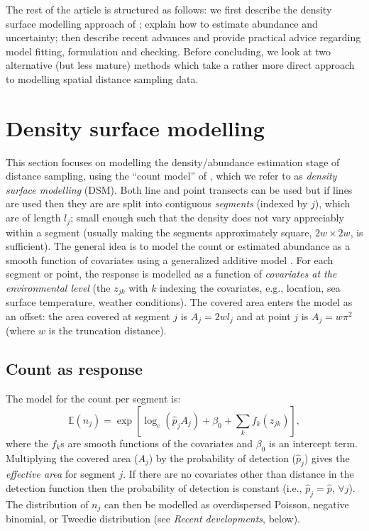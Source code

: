 \documentclass[a4paper,12pt]{article}
\begin{document}
The rest of the article is structured as follows: we first describe the density surface modelling approach of \cite{Hedley:2004et}; explain how to estimate abundance and uncertainty; then describe recent advances and provide practical advice regarding model fitting, formulation and checking. Before concluding, we look at two alternative (but less mature) methods which take a rather more direct approach to modelling spatial distance sampling data.


\section*{Density surface modelling}
\label{s:dsm}

This section focuses on modelling the density/abundance estimation stage of distance sampling, using the ``count model'' of \cite{Hedley:2004et}, which we refer to as \textit{density surface modelling} (DSM). Both line and point transects can be used but if lines are used then they are are split into contiguous \textit{segments} (indexed by $j$), which are of length $l_j$; small enough such that the density does not vary appreciably within a segment (usually making the segments approximately square, $2w\times 2w$, is sufficient). The general idea is to model the count or estimated abundance as a smooth function of covariates using a generalized additive model \cite[GAM; e.g.][]{Wood:2006wz}. For each segment or point, the response is modelled as a function of \textit{covariates at the environmental level} (the $z_{jk}$ with $k$ indexing the covariates, e.g., location, sea surface temperature, weather conditions). The covered area enters the model as an offset: the area covered at segment $j$ is $A_j = 2wl_j$ and at point $j$ is $A_j=w\pi^2$ (where $w$ is the truncation distance). 

\subsection*{Count as response}

The model for the count per segment is:
\begin{equation*}
\mathbb{E}(n_j) = \exp\left[ \log_e \left( \hat{p}_j A_j \right) + \beta_0 + \sum_k f_k\left(z_{jk}\right) \right],
\end{equation*}
where the $f_k$s are smooth functions of the covariates and $\beta_0$ is an intercept term. Multiplying the covered area ($A_j$) by the probability of detection ($\hat{p}_j$) gives the \textit{effective area} for segment $j$. If there are no covariates other than distance in the detection function then the probability of detection is constant (i.e., $\hat{p}_j=\hat{p}$, $\forall j$). The distribution of $n_j$ can then be modelled as overdispersed Poisson, negative binomial, or Tweedie distribution (see \textit{Recent developments}, below).
\end{document}
